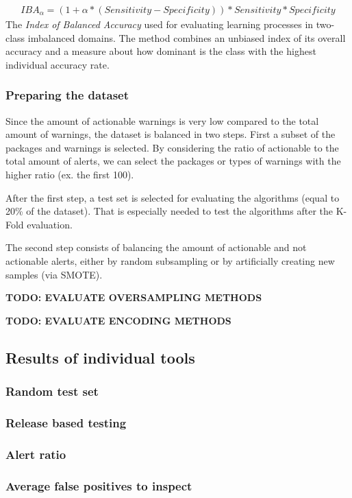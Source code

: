 \begin{gather*}
IBA_{\alpha} = (1 + \alpha * (Sensitivity - Specificity)) * Sensitivity * Specificity
\end{gather*} 
The \textit{Index of Balanced Accuracy} used for evaluating learning processes in two-class imbalanced domains. The
method combines an unbiased index of its overall accuracy and a measure about
how dominant is the class with the highest individual accuracy rate.


\subsubsection{Preparing the dataset}
Since the amount of actionable warnings is very low compared to the total amount of warnings, the dataset is balanced in two steps. First a subset of the packages and warnings is selected. By considering the ratio of actionable to the total amount of alerts, we can select the packages or types of warnings with the higher ratio (ex. the first 100).

After the first step, a test set is selected for evaluating the algorithms (equal to 20\% of the dataset).
That is especially needed to test the algorithms after the K-Fold evaluation.

The second step consists of balancing the amount of actionable and not actionable alerts, either by random subsampling or by artificially creating new samples (via SMOTE).


\textbf{TODO: EVALUATE OVERSAMPLING METHODS}

\textbf{TODO: EVALUATE ENCODING METHODS}

\subsection{Results of individual tools}

\subsubsection{Random test set}
\subsubsection{Release based testing}
\subsubsection{Alert ratio}
\subsubsection{Average false positives to inspect}







